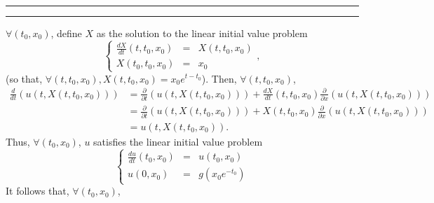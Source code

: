 \documentclass[11pt]{article}
\newcounter{questionCounter}
\newcounter{partCounter}[questionCounter]
\newenvironment{question}[2][\arabic{questionCounter}]{%
    \setcounter{partCounter}{0}%
    \vspace{.25in} \hrule \vspace{0.5em}%
        \noindent{\bf #2}%
    \vspace{0.8em} \hrule \vspace{.10in}%
    \addtocounter{questionCounter}{1}%
}{}
\begin{document}
\begin{question}{Problem 3}
$\forall (t_0,x_0)$, define $X$ as the solution to the linear initial value
problem
\[
    \left\{
        \begin{array}{rcl}
            \frac{dX}{dt}(t,t_0,x_0) & = & X(t,t_0,x_0) \\
            X(t_0,t_0,x_0)     & = & x_0
        \end{array}
    \right.,
\]
(so that, $\forall (t,t_0,x_0), X(t,t_0,x_0) = x_0e^{t - t_0}$). Then, $\forall
(t,t_0,x_0)$,
\begin{align*}
   \frac{d}{dt}(u(t,X(t,t_0,x_0)))
 & = \frac{\partial }{\partial t}(u(t,X(t,t_0,x_0)))
 + \frac{dX}{dt}(t,t_0,x_0) \frac{\partial }{\partial x}(u(t,X(t,t_0,x_0))) \\
 & = \frac{\partial }{\partial t}(u(t,X(t,t_0,x_0)))
 + X(t,t_0,x_0) \frac{\partial }{\partial x}(u(t,X(t,t_0,x_0))) \\
 & = u(t,X(t,t_0,x_0)).
\end{align*}
Thus, $\forall (t_0,x_0)$, $u$ satisfies the linear initial value problem
\[
    \left\{
        \begin{array}{rcl}
            \frac{du}{dt}(t_0,x_0) & = & u(t_0,x_0) \\
            u(0,x_0)               & = & g(x_0e^{-t_0})
        \end{array}
    \right.
\]
It follows that, $\forall (t_0,x_0)$,
\end{question}
\end{document}
